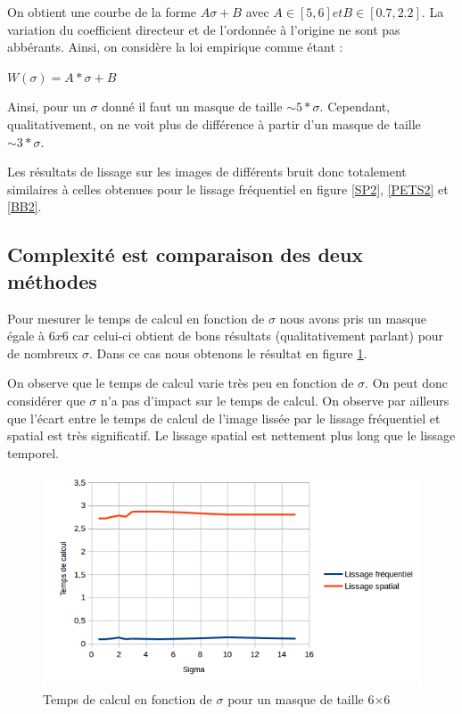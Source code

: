 \documentclass[paper=a4, fontsize=11pt]{scrartcl} %
\begin{document}
On obtient une courbe de la forme $A\sigma + B$ avec $A \in [5,6] et B\in[0.7,2.2]$. La variation du coefficient directeur et de l'ordonnée à l'origine ne sont pas abbérants.
Ainsi, on considère la loi empirique comme étant : 
\begin{center}
$W(\sigma) = A*\sigma+B$
\end{center}

Ainsi, pour un $\sigma$ donné il faut un masque de taille $\sim 5*\sigma$. Cependant, qualitativement, on ne voit plus de différence à partir d'un masque de taille $\sim 3*\sigma$. 

Les résultats de lissage sur les images de différents bruit donc totalement similaires à celles obtenues pour le lissage fréquentiel en figure \ref{SP2}, \ref{PETS2} et \ref{BB2}.
\subsection{Complexité est comparaison des deux méthodes}
Pour mesurer le temps de calcul en fonction de $\sigma$ nous avons pris un masque égale à $6x6$ car celui-ci obtient de bons résultats (qualitativement parlant) pour de nombreux $\sigma$. Dans ce cas nous obtenons le résultat en figure \ref{tempscalculsigma}.

On observe que le temps de calcul varie très peu en fonction de $\sigma$. On peut donc considérer que $\sigma$ n'a pas d'impact sur le temps de calcul. On observe par ailleurs que l'écart entre le temps de calcul de l'image lissée par le lissage fréquentiel et spatial est très significatif. Le lissage spatial est nettement plus long que le lissage temporel.


\begin{figure}
\centering
\caption{Temps de calcul en fonction de $\sigma$ pour un masque de taille 6$\times$6}
\label{tempscalculsigma}
\includegraphics[scale=1]{images/rapport/courbes/temps_calcul_sigma.png} 
\end{figure}
\end{document}
